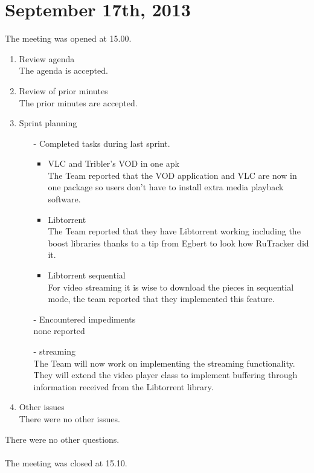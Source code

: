 \section{September 17th, 2013}

The meeting was opened at 15.00.

\begin{enumerate}
\item Review agenda\\
The agenda is accepted.
\item Review of prior minutes \\
The prior minutes are accepted.
\item Sprint planning\\
\begin{enumerate}
\item[-] Completed tasks during last sprint.\\
	\begin{itemize}
	\item VLC and Tribler's VOD in one apk\\
	The Team reported that the VOD application and VLC are now in one package so users don't have to install extra media playback software.
	\item Libtorrent\\
	The Team reported that they have Libtorrent working including the boost libraries thanks to a tip from Egbert to look how RuTracker did it.
	\item Libtorrent sequential\\
	For video streaming it is wise to download the pieces in sequential mode, the team reported that they implemented this feature. 
	\end{itemize}
\item[-] Encountered impediments\\
none reported
\item[-] streaming\\
The Team will now work on implementing the streaming functionality. They will extend the video player class to implement buffering through information received from the Libtorrent library. 
\end{enumerate}
\item Other issues\\
There were no other issues.
\end{enumerate}
There were no other questions.\\
\\
The meeting was closed at 15.10.
